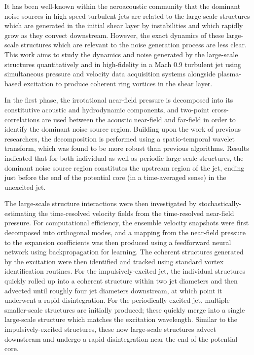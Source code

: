 It has been well-known within the aeroacoustic community that the dominant noise sources in high-speed turbulent jets are related to the large-scale structures which are generated in the initial shear layer by instabilities and which rapidly grow as they convect downstream.
However, the exact dynamics of these large-scale structures which are relevant to the noise generation process are less clear.
This work aims to study the dynamics and noise generated by the large-scale structures quantitatively and in high-fidelity in a Mach 0.9 turbulent jet using simultaneous pressure and velocity data acquisition systems alongside plasma-based excitation to produce coherent ring vortices in the shear layer.

In the first phase, the irrotational near-field pressure is decomposed into its constitutive acoustic and hydrodynamic components, and two-point cross-correlations are used between the acoustic near-field and far-field in order to identify the dominant noise source region.
Building upon the work of previous researchers, the decomposition is performed using a spatio-temporal wavelet transform, which was found to be more robust than previous algorithms.
Results indicated that for both individual as well as periodic large-scale structures, the dominant noise source region constitutes the upstream region of the jet, ending just before the end of the potential core (in a time-averaged sense) in the unexcited jet.

The large-scale structure interactions were then investigated by stochastically-estimating the time-resolved velocity fields from the time-resolved near-field pressure.
For computational efficiency, the ensemble velocity snapshots were first decomposed into orthogonal modes, and a mapping from the near-field pressure to the expansion coefficients was then produced using a feedforward neural network using backpropagation for learning.
The coherent structures generated by the excitation were then identified and tracked using standard vortex identification routines.
For the impulsively-excited jet, the individual structures quickly rolled up into a coherent structure within two jet diameters and then advected until roughly four jet diameters downstream, at which point it underwent a rapid disintegration.
For the periodically-excited jet, multiple smaller-scale structures are initially produced; these quickly merge into a single large-scale structure which matches the excitation wavelength.
Similar to the impulsively-excited structures, these now large-scale structures advect downstream and undergo a rapid disintegration near the end of the potential core. 


